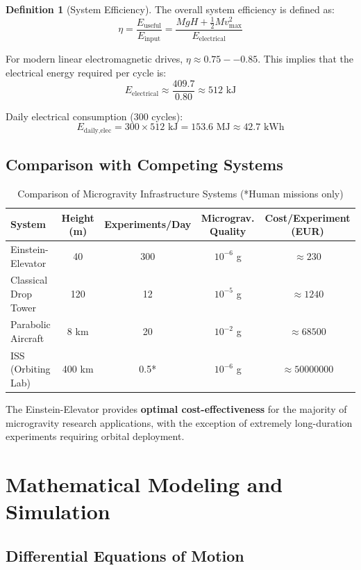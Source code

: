 ﻿\documentclass[a4paper,12pt]{article}
\theoremstyle{definition}
\newtheorem{definition}{Definition}
\begin{document}
\begin{definition}[System Efficiency]
The overall system efficiency is defined as:
\[
\eta = \frac{E_{\text{useful}}}{E_{\text{input}}} = \frac{M g H + \frac{1}{2} M v_{\text{max}}^2}{E_{\text{electrical}}}
\]
\end{definition}

For modern linear electromagnetic drives, $\eta \approx 0.75--0.85$. This implies that the electrical energy required per cycle is:
\[
E_{\text{electrical}} \approx \frac{409.7}{0.80} \approx 512 \text{ kJ}
\]

Daily electrical consumption (300 cycles):
\[
E_{\text{daily,elec}} = 300 \times 512 \text{ kJ} = 153.6 \text{ MJ} \approx 42.7 \text{ kWh}
\]

\subsection{Comparison with Competing Systems}

\begin{table}
\centering
\begin{tabular}{|l|c|c|c|c|}
\hline
\textbf{System} & \textbf{Height (m)} & \textbf{Experiments/Day} & \textbf{Micrograv. Quality} & \textbf{Cost/Experiment (EUR)} \\
\hline
Einstein-Elevator & 40 & 300 & $10^{-6}$ g & $\approx 230$ \\
Classical Drop Tower & 120 & 12 & $10^{-5}$ g & $\approx 1240$ \\
Parabolic Aircraft & 8 km & 20 & $10^{-2}$ g & $\approx 68500$ \\
ISS (Orbiting Lab) & 400 km & 0.5* & $10^{-6}$ g & $\approx 50000000$ \\
\hline
\end{tabular}
\caption{Comparison of Microgravity Infrastructure Systems (*Human missions only)}
\end{table}

The Einstein-Elevator provides \textbf{optimal cost-effectiveness} for the majority of microgravity research applications, with the exception of extremely long-duration experiments requiring orbital deployment.

\section{Mathematical Modeling and Simulation}

\subsection{Differential Equations of Motion}
\end{document}
